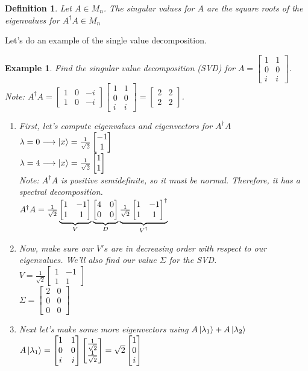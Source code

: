\documentclass[12pt]{article}
\theoremstyle{plain}
\theoremstyle{nonumberplain}
\theoremstyle{plain}
\newtheorem{definition}[lemma]{Definition}
\newtheorem{example}[lemma]{Example}
\theoremstyle{nonumberplain}
\newcommand\1{{\bf 1}}
\newcommand{\bmat}[1]{\begin{bmatrix*} #1 \end{bmatrix*}} %
\newcommand{\<}{\left\langle}
\renewcommand{\>}{\right\rangle}
\begin{document}
\begin{definition}
Let $A\in M_n$. The singular values for $A$ are the square roots of the eigenvalues for $A^\dagger A\in M_n$
\end{definition}
Let's do an example of the single value decomposition.
\begin{example} Find the singular value decomposition (SVD) for $A=\bmat{1 & 1 \\ 0 & 0 \\ i & i}$. \\
Note: $A^\dagger A=\bmat{1 & 0 & -i \\ 1 & 0 & -i}\bmat{1 & 1 \\ 0 & 0 \\ i & i}=\bmat{2 & 2 \\ 2 & 2}$.
\begin{enumerate}
\item First, let's compute eigenvalues and eigenvectors for $A^\dagger A$ \\
$\lambda=0\longrightarrow\ket{x}=\frac{1}{\sqrt{2}}\bmat{-1 \\ 1}$ \\
$\lambda=4\longrightarrow\ket{x}=\frac{1}{\sqrt{2}}\bmat{1 \\ 1}$ \\
Note: $A^\dagger A$ is positive semidefinite, so it must be normal. Therefore, it has a spectral decomposition. \\
$A^\dagger A=\frac{1}{\sqrt{2}}\underbrace{\textstyle \bmat{1 & -1 \\ 1 & 1}}_{\mathclap{V}}\underbrace{\textstyle \bmat{4 & 0 \\ 0 & 0}}_{\mathclap{D}}\underbrace{\textstyle \frac{1}{\sqrt{2}}\bmat{1 & -1 \\ 1 & 1}^\dagger}_{\mathclap{V^\dagger}}$
\item Now, make sure our $V's$ are in decreasing order with respect to our eigenvalues. We'll also find our value $\Sigma$ for the SVD. \\
$V=\frac{1}{\sqrt{2}}\bmat{1 & -1 \\ 1 & 1}$ \\
$\Sigma=\bmat{2 & 0 \\ 0 & 0 \\ 0 & 0}$
\item Next let's make some more eigenvectors using $A\ket{\lambda_1}+A\ket{\lambda_2}$ \\
$A\ket{\lambda_1}=\bmat{1 & 1 \\ 0 & 0 \\ i & i}\bmat{\frac{1}{\sqrt{2}} \\ \frac{1}{\sqrt{2}}}=\sqrt{2}\bmat{1 \\ 0 \\ i}$ \\

\end{enumerate}
\end{example}
\end{document}
